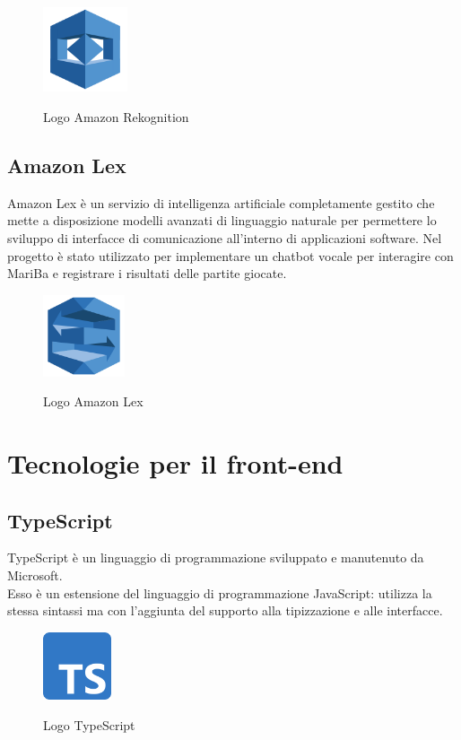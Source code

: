 	\begin{figure}[H]
		\centering
		\includegraphics[width=2.5cm]{immagini/rekognition.png} \\
		\caption{\label{fig:logo_rekognition} Logo Amazon Rekognition}
	\end{figure}
	
	\subsection{Amazon Lex}
	Amazon Lex è un servizio di intelligenza artificiale completamente gestito che mette a disposizione modelli avanzati di linguaggio naturale per permettere lo sviluppo di interfacce di comunicazione all'interno di applicazioni software. Nel progetto è stato utilizzato per implementare un chatbot vocale per interagire con MariBa e registrare i risultati delle partite giocate.
	
	\begin{figure}[H]
		\centering
		\includegraphics[width=2.4cm]{immagini/lex.png} \\
		\caption{\label{fig:logo_lex} Logo Amazon Lex}
	\end{figure}

\section{Tecnologie per il front-end}
	\subsection{TypeScript}
	TypeScript è un linguaggio di programmazione sviluppato e manutenuto da Microsoft. \\
	Esso è un estensione del linguaggio di programmazione JavaScript: utilizza la stessa sintassi ma con l'aggiunta del supporto alla tipizzazione e alle interfacce. 
	
	\begin{figure}[H]
		\centering
		\includegraphics[width=2cm]{immagini/typescript.png} \\
		\caption{\label{fig:logo_typescript} Logo TypeScript}
	\end{figure}

